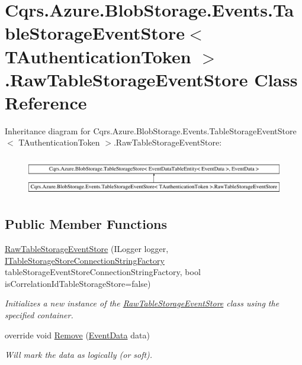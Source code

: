 \hypertarget{classCqrs_1_1Azure_1_1BlobStorage_1_1Events_1_1TableStorageEventStore_1_1RawTableStorageEventStore}{}\section{Cqrs.\+Azure.\+Blob\+Storage.\+Events.\+Table\+Storage\+Event\+Store$<$ T\+Authentication\+Token $>$.Raw\+Table\+Storage\+Event\+Store Class Reference}
\label{classCqrs_1_1Azure_1_1BlobStorage_1_1Events_1_1TableStorageEventStore_1_1RawTableStorageEventStore}
Inheritance diagram for Cqrs.\+Azure.\+Blob\+Storage.\+Events.\+Table\+Storage\+Event\+Store$<$ T\+Authentication\+Token $>$.Raw\+Table\+Storage\+Event\+Store\+:\begin{figure}[H]
\begin{center}
\leavevmode
\includegraphics[height=1.723077cm]{classCqrs_1_1Azure_1_1BlobStorage_1_1Events_1_1TableStorageEventStore_1_1RawTableStorageEventStore}
\end{center}
\end{figure}
\subsection*{Public Member Functions}
\begin{DoxyCompactItemize}
\item 
\hyperlink{classCqrs_1_1Azure_1_1BlobStorage_1_1Events_1_1TableStorageEventStore_1_1RawTableStorageEventStore_aa6aa02462732467a16148e0d094cd308_aa6aa02462732467a16148e0d094cd308}{Raw\+Table\+Storage\+Event\+Store} (I\+Logger logger, \hyperlink{interfaceCqrs_1_1Azure_1_1BlobStorage_1_1ITableStorageStoreConnectionStringFactory}{I\+Table\+Storage\+Store\+Connection\+String\+Factory} table\+Storage\+Event\+Store\+Connection\+String\+Factory, bool is\+Correlation\+Id\+Table\+Storage\+Store=false)
\begin{DoxyCompactList}\small\item\em Initializes a new instance of the \hyperlink{classCqrs_1_1Azure_1_1BlobStorage_1_1Events_1_1TableStorageEventStore_1_1RawTableStorageEventStore}{Raw\+Table\+Storage\+Event\+Store} class using the specified container. \end{DoxyCompactList}\item 
override void \hyperlink{classCqrs_1_1Azure_1_1BlobStorage_1_1Events_1_1TableStorageEventStore_1_1RawTableStorageEventStore_a0c71f309e7ec1a349f4862c7021661de_a0c71f309e7ec1a349f4862c7021661de}{Remove} (\hyperlink{classCqrs_1_1Events_1_1EventData}{Event\+Data} data)
\begin{DoxyCompactList}\small\item\em Will mark the {\itshape data}  as logically (or soft). \end{DoxyCompactList}\end{DoxyCompactItemize}

